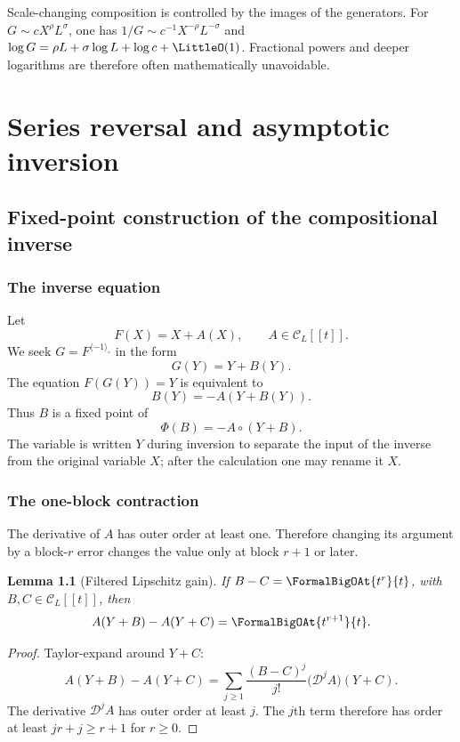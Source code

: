 \documentclass[11pt,oneside]{book}
\newtheorem{lemma}[theorem]{Lemma}
\theoremstyle{definition}
\theoremstyle{remark}
\newcommand{\D}{\mathcal D}
\newcommand{\compinv}{^{\langle-1\rangle_{\circ}}}
\newcommand{\compose}{\mathbin{\circ}}
\begin{document}
\begin{summarybox}
Scale-changing composition is controlled by the images of the generators.
For $G\sim cX^\rho L^\sigma$, one has
$1/G\sim c^{-1}X^{-\rho}L^{-\sigma}$ and
$\log G=\rho L+\sigma\log L+\log c+\LittleO(1)$.  Fractional powers and deeper
logarithms are therefore often mathematically unavoidable.
\end{summarybox}

\part{Series reversal and asymptotic inversion}
\label{part:reversion}

\chapter{Fixed-point construction of the compositional inverse}
\label{ch:reversion-fixed}

\section{The inverse equation}
Let
\begin{equation}\label{eq:F-near-id-reversion}
 F(X)=X+A(X),
 \qquad A\in\mathcal C_L[[t]].
\end{equation}
We seek $G=F\compinv$ in the form
\[
 G(Y)=Y+B(Y).
\]
The equation $F(G(Y))=Y$ is equivalent to
\begin{equation}\label{eq:inverse-fixed-B}
 B(Y)=-A(Y+B(Y)).
\end{equation}
Thus $B$ is a fixed point of
\begin{equation}\label{eq:Phi-inverse}
 \Phi(B)=-A\compose(Y+B).
\end{equation}
The variable is written $Y$ during inversion to separate the input of the
inverse from the original variable $X$; after the calculation one may rename
it $X$.

\section{The one-block contraction}
The derivative of $A$ has outer order at least one.  Therefore changing its
argument by a block-$r$ error changes the value only at block $r+1$ or later.

\begin{lemma}[Filtered Lipschitz gain]\label{lem:inverse-contraction}
If $B-C=\FormalBigOAt{t^r}{t}$, with $B,C\in\mathcal C_L[[t]]$, then
\begin{equation}\label{eq:inverse-contraction}
 A(Y+B)-A(Y+C)=\FormalBigOAt{t^{r+1}}{t}.
\end{equation}
\end{lemma}
\begin{proof}
Taylor-expand around $Y+C$:
\[
 A(Y+B)-A(Y+C)
 =\sum_{j\ge1}\frac{(B-C)^j}{j!}
 \bigl(\D^jA\bigr)(Y+C).
\]
The derivative $\D^jA$ has outer order at least $j$.  The $j$th term therefore
has order at least $jr+j\ge r+1$ for $r\ge0$.
\end{proof}
\end{document}
